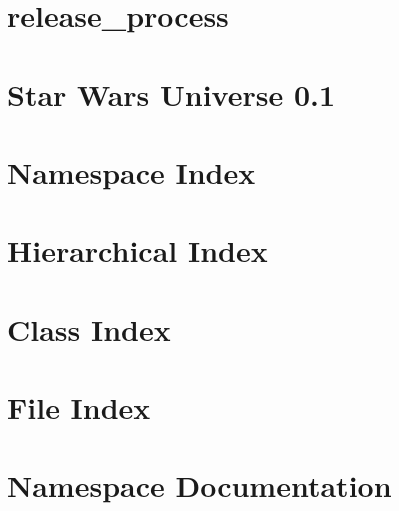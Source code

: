 \let\mypdfximage\pdfximage\def\pdfximage{\immediate\mypdfximage}\documentclass[twoside]{book}
\newcommand{\+}{\discretionary{\mbox{\scriptsize$\hookleftarrow$}}{}{}}
\begin{document}
\chapter{release\+\_\+process}
\label{md__c___users__u_s_e_r_source_repos_bzareva_star_wars_universe_0_1_doctest_scripts_release_process}

\chapter{Star Wars Universe 0.1}
\label{md__c___users__u_s_e_r_source_repos_bzareva_star_wars_universe_0_1__r_e_a_d_m_e}

\chapter{Namespace Index}

\chapter{Hierarchical Index}

\chapter{Class Index}

\chapter{File Index}

\chapter{Namespace Documentation}





























\end{document}
